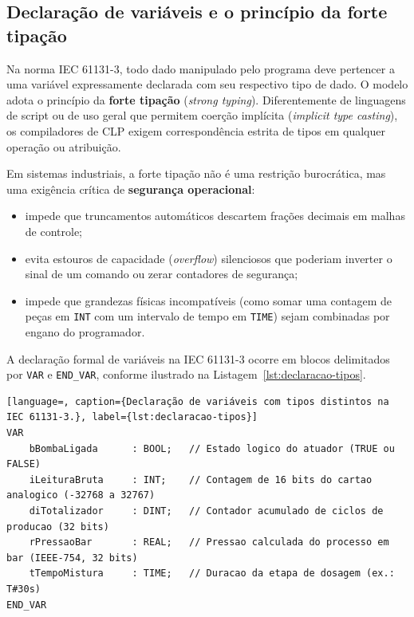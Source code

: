 
\subsection{Declaração de variáveis e o princípio da forte tipação}

Na norma IEC 61131-3, todo dado manipulado pelo programa deve pertencer a uma variável expressamente
declarada com seu respectivo tipo de dado. O modelo adota o princípio da \textbf{forte tipação}
(\emph{strong typing}). Diferentemente de linguagens de script ou de uso geral que permitem coerção
implícita (\emph{implicit type casting}), os compiladores de CLP exigem correspondência estrita de
tipos em qualquer operação ou atribuição.

Em sistemas industriais, a forte tipação não é uma restrição burocrática, mas uma exigência crítica
de \textbf{segurança operacional}:
\begin{itemize}
  \item impede que truncamentos automáticos descartem frações decimais em malhas de controle;
  \item evita estouros de capacidade (\emph{overflow}) silenciosos que poderiam inverter o sinal de
        um comando ou zerar contadores de segurança;
  \item impede que grandezas físicas incompatíveis (como somar uma contagem de peças em \texttt{INT}
        com um intervalo de tempo em \texttt{TIME}) sejam combinadas por engano do programador.
\end{itemize}

A declaração formal de variáveis na IEC 61131-3 ocorre em blocos delimitados por \texttt{VAR} e
\texttt{END\_VAR}, conforme ilustrado na Listagem~\ref{lst:declaracao-tipos}.

\begin{lstlisting}[language=, caption={Declaração de variáveis com tipos distintos na IEC 61131-3.}, label={lst:declaracao-tipos}]
VAR
    bBombaLigada      : BOOL;   // Estado logico do atuador (TRUE ou FALSE)
    iLeituraBruta     : INT;    // Contagem de 16 bits do cartao analogico (-32768 a 32767)
    diTotalizador     : DINT;   // Contador acumulado de ciclos de producao (32 bits)
    rPressaoBar       : REAL;   // Pressao calculada do processo em bar (IEEE-754, 32 bits)
    tTempoMistura     : TIME;   // Duracao da etapa de dosagem (ex.: T#30s)
END_VAR
\end{lstlisting}

